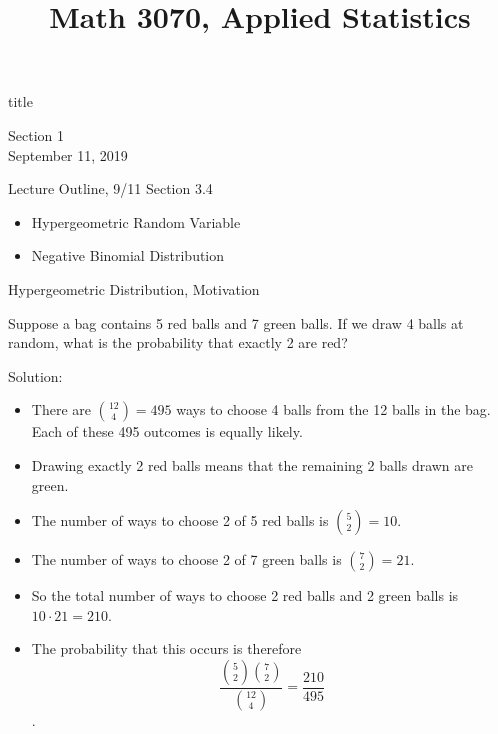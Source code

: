 \documentclass[handout]{beamer}
\title{Math 3070, Applied Statistics}
\newcommand{\nl}[1]{\vspace{#1 em}}
\begin{document}
\begin{frame}
    \begin{beamercolorbox}[rounded=true,wd=\textwidth,center]{title}
        \inserttitle
    \end{beamercolorbox}
    \begin{center}
        Section 1\\
        \nl{0.5}
        September 11, 2019
    \end{center}
\end{frame}

\begin{frame}{Lecture Outline, 9/11}
    Section 3.4
    \begin{itemize}
        \item Hypergeometric Random Variable
        \item Negative Binomial Distribution
    \end{itemize}
\end{frame}

\begin{frame}{Hypergeometric Distribution, Motivation}
    \begin{block}{}
    Suppose a bag contains 5 red balls and 7 green balls. If we draw 4 balls at random, what is the probability that exactly 2 are red?
    \end{block}
    
    \pause Solution:
    \begin{itemize}
    \pause \item There are $\binom{12}4=495$ ways to choose 4 balls from the 12 balls in the bag. Each of these 495 outcomes is equally likely. 
    \pause \item Drawing exactly 2 red balls means that the remaining 2 balls drawn are green.
    \pause \item The number of ways to choose 2 of 5 red balls is $\binom 5 2= 10$.
    \pause \item The number of ways to choose 2 of 7 green balls is $\binom 7 2=21$.
    \pause \item So the total number of ways to choose 2 red balls and 2 green balls is $10 \cdot 21= 210$. 
    \pause \item The probability that this occurs is therefore $$\frac{\binom 5 2 \binom 7 2 }{\binom{12}4} = \frac{210}{495}$$.
    \end{itemize}
    \end{frame}
\end{document}
